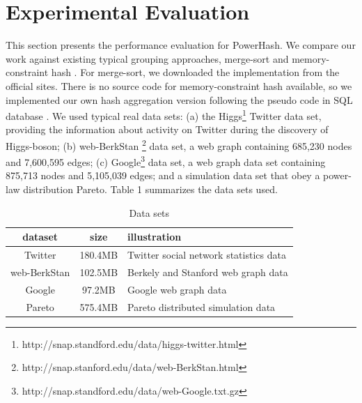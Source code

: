 \section{Experimental Evaluation}


This section presents the performance evaluation for PowerHash. We compare our work against existing typical grouping approaches, merge-sort \cite{dean2008mapreduce} and memory-constraint hash \cite{bartholomew2012mariadb}. For merge-sort, we downloaded the implementation from the official sites. There is no source code for memory-constraint hash available, so we implemented our own hash aggregation version following the pseudo code in SQL database \cite{HashAggregate15}. We used typical real data sets:  (a) the Higgs\footnote{http://snap.standford.edu/data/higgs-twitter.html} Twitter data set, providing the information about activity on Twitter during the discovery of Higgs-boson; (b) web-BerkStan \footnote{http://snap.stanford.edu/data/web-BerkStan.html} data set, a web graph containing 685,230 nodes and 7,600,595 edges;  (c) Google\footnote{http://snap.standford.edu/data/web-Google.txt.gz} data set, a web graph data set containing 875,713 nodes and 5,105,039 edges; and a simulation data set that obey a power-law distribution Pareto. Table 1 summarizes the data sets used.

\begin{table}[h]
  \caption{Data sets}
  \label{tab:dataset}
  \begin{tabular}{ccl}
    \toprule
    dataset &size & illustration\\
    \midrule
    Twitter & 180.4MB& Twitter social network statistics data\\
	web-BerkStan & 102.5MB& Berkely and Stanford web graph data\\
    Google & 97.2MB & Google web graph data\\
    Pareto & 575.4MB & Pareto distributed simulation data\\
    \bottomrule
  \end{tabular}
\end{table}

